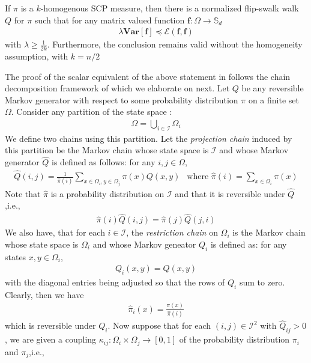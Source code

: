 \begin{theorem}\label{thm:mpc} If $\pi$ is a $k$-homogenous SCP measure, then there is a  normalized flip-swalk walk $Q$ for $\pi$ such that for any matrix valued function $\mathbf{f} : \Omega \rightarrow \mathbb{S}_d$
  \begin{align*}
    \lambda\mathbf{Var}[\mathbf{f}]\preceq \mathcal{E}(\mathbf{f},\mathbf{f})
  \end{align*}
  with $\lambda \geq \frac{1}{2k}$. Furthermore, the conclusion remains valid without the homogeneity assumption, with $k=n/2$
\end{theorem}
The proof of the scalar equivalent of the above statement in \cite{HS19} follows the chain decomposition framework of \cite{JSTV04} which we elaborate on next. Let $Q$ be any reversible Markov generator with respect to some probability distribution $\pi$ on a finite set $\Omega$. Consider any partition of the state space :
\begin{align*}
  \Omega = \bigcup\limits_{i \in \mathcal{I}}\Omega_i
\end{align*}
We define two chains using this partition. Let the \textit{projection chain} induced by this partition be the Markov chain whose state space is $\mathcal{I}$ and whose Markov generator $\hat{Q}$ is defined as follows: for any $i,j \in \Omega$,
\begin{align*}
  \hat{Q}(i,j) = \frac{1}{\hat{\pi}(i)}\sum\limits_{x \in \Omega_i, y \in \Omega_j} \pi(x) Q(x,y) \ \ \text{ where } \hat{\pi}(i) = \sum\limits_{x \in \Omega_i} \pi(x)
\end{align*}
Note that $\hat{\pi}$ is a probability distribution on $\mathcal{I}$ and that it is reversible under $\hat{Q}$,i.e.,
\begin{align*}
  \hat{\pi}(i) \hat{Q}(i,j) =   \hat{\pi}(j) \hat{Q}(j,i)
\end{align*}
We also have, that for each $i \in \mathcal{I}$, the \textit{restriction chain} on $\Omega_i$ is the Markov chain whose state space is $\Omega_i$ and whose Markov geneator $Q_i$ is defined as: for any states $x,y \in \Omega_i$,
\begin{align*}
  Q_i(x,y) = Q(x,y)
  \end{align*}
with the diagonal entries being adjusted so that the rows of $Q_i$ sum to zero. Clearly, then we have \begin{align*}\hat{\pi}_i(x) = \frac{\pi(x)}{\hat{\pi}(i)}\end{align*}
which is reversible under $Q_i$. Now suppose that for each $(i,j) \in \mathcal{I}^2$ with $\hat{Q}_{ij} > 0$, we are given a coupling $\kappa_{ij} : \Omega_i \times \Omega_j \rightarrow [0,1]$ of the probability distribution $\pi_i$ and $\pi_j$,i.e.,
